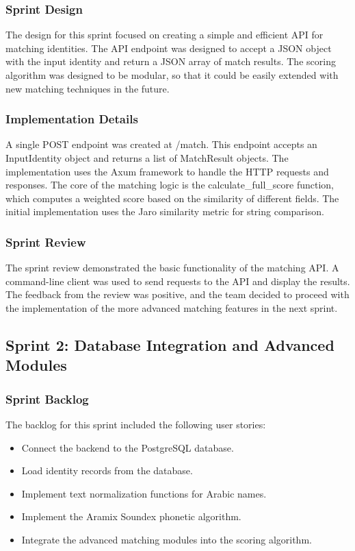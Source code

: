 \subsubsection{Sprint Design}
The design for this sprint focused on creating a simple and efficient API for matching identities. The API endpoint was designed to accept a JSON object with the input identity and return a JSON array of match results. The scoring algorithm was designed to be modular, so that it could be easily extended with new matching techniques in the future.

\subsubsection{Implementation Details}
A single POST endpoint was created at /match. This endpoint accepts an InputIdentity object and returns a list of MatchResult objects. The implementation uses the Axum framework to handle the HTTP requests and responses. The core of the matching logic is the calculate_full_score function, which computes a weighted score based on the similarity of different fields. The initial implementation uses the Jaro similarity metric for string comparison.

\subsubsection{Sprint Review}
The sprint review demonstrated the basic functionality of the matching API. A command-line client was used to send requests to the API and display the results. The feedback from the review was positive, and the team decided to proceed with the implementation of the more advanced matching features in the next sprint.

\subsection{Sprint 2: Database Integration and Advanced Modules}
\subsubsection{Sprint Backlog}
The backlog for this sprint included the following user stories:
\begin{itemize}
    \item Connect the backend to the PostgreSQL database.
    \item Load identity records from the database.
    \item Implement text normalization functions for Arabic names.
    \item Implement the Aramix Soundex phonetic algorithm.
    \item Integrate the advanced matching modules into the scoring algorithm.
\end{itemize}

